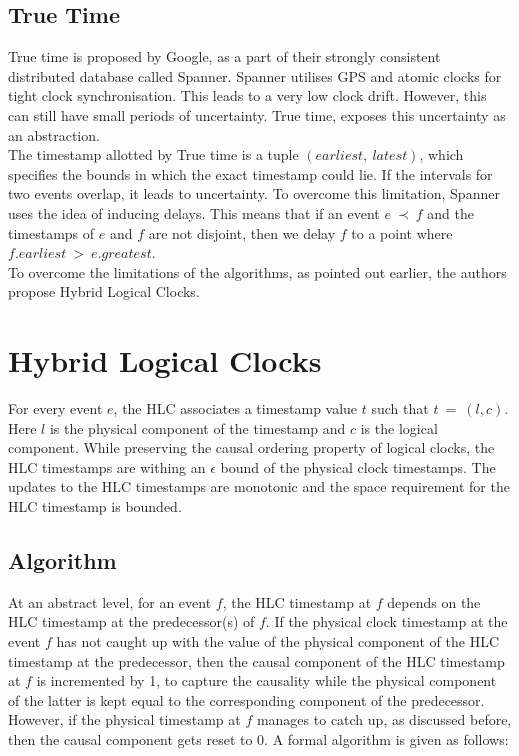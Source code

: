 \documentclass{article}
\begin{document}
    \subsection{True Time}

    True time is proposed by Google, as a part of their strongly consistent distributed database called Spanner\cite{spanner}. Spanner utilises GPS and atomic clocks for tight clock synchronisation. This leads to a very low clock drift. However, this can still have small periods of uncertainty. True time, exposes this uncertainty as an abstraction. \\

    The timestamp allotted by True time is a tuple $(earliest,\ latest)$, which specifies the bounds in which the exact timestamp could lie. If the intervals for two events overlap, it leads to uncertainty. To overcome this limitation, Spanner uses the idea of inducing delays. This means that if an event $e\ \prec\ f$ and the timestamps of $e$ and $f$ are not disjoint, then we delay $f$ to a point where $f.earliest\ >\ e.greatest$. \\

    To overcome the limitations of the algorithms, as pointed out earlier, the authors propose Hybrid Logical Clocks.

    \section{Hybrid Logical Clocks}

    For every event $e$, the HLC associates a timestamp value $t$ such that $t\ =\ (l,c)$. Here $l$ is the physical component of the timestamp and $c$ is the logical component. While preserving the causal ordering property of logical clocks, the HLC timestamps are withing an $\epsilon$ bound of the physical clock timestamps. The updates to the HLC timestamps are monotonic and the space requirement for the HLC timestamp is bounded.

    \subsection{Algorithm}

    At an abstract level, for an event $f$, the HLC timestamp at $f$ depends on the HLC timestamp at the predecessor(s) of $f$. If the physical clock timestamp at the event $f$ has not caught up with the value of the physical component of the HLC timestamp at the predecessor, then the causal component of the HLC timestamp at $f$ is incremented by 1, to capture the causality while the physical component of the latter is kept equal to the corresponding component of the predecessor. However, if the physical timestamp at $f$ manages to catch up, as discussed before, then the causal component gets reset to 0. A formal algorithm is given as follows: 
\end{document}
